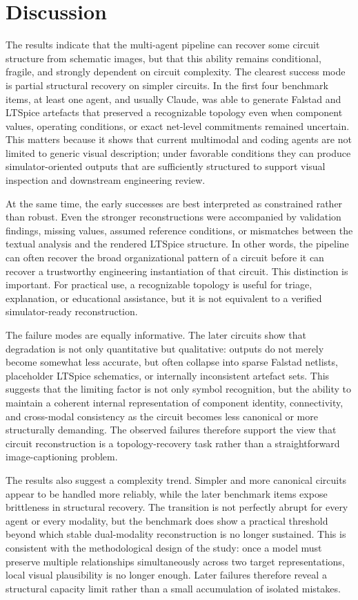 \section{Discussion}

The results indicate that the multi-agent pipeline can recover some circuit structure from schematic images, but that this ability remains conditional, fragile, and strongly dependent on circuit complexity. The clearest success mode is partial structural recovery on simpler circuits. In the first four benchmark items, at least one agent, and usually Claude, was able to generate Falstad and LTSpice artefacts that preserved a recognizable topology even when component values, operating conditions, or exact net-level commitments remained uncertain. This matters because it shows that current multimodal and coding agents are not limited to generic visual description; under favorable conditions they can produce simulator-oriented outputs that are sufficiently structured to support visual inspection and downstream engineering review.

At the same time, the early successes are best interpreted as constrained rather than robust. Even the stronger reconstructions were accompanied by validation findings, missing values, assumed reference conditions, or mismatches between the textual analysis and the rendered LTSpice structure. In other words, the pipeline can often recover the broad organizational pattern of a circuit before it can recover a trustworthy engineering instantiation of that circuit. This distinction is important. For practical use, a recognizable topology is useful for triage, explanation, or educational assistance, but it is not equivalent to a verified simulator-ready reconstruction.

The failure modes are equally informative. The later circuits show that degradation is not only quantitative but qualitative: outputs do not merely become somewhat less accurate, but often collapse into sparse Falstad netlists, placeholder LTSpice schematics, or internally inconsistent artefact sets. This suggests that the limiting factor is not only symbol recognition, but the ability to maintain a coherent internal representation of component identity, connectivity, and cross-modal consistency as the circuit becomes less canonical or more structurally demanding. The observed failures therefore support the view that circuit reconstruction is a topology-recovery task rather than a straightforward image-captioning problem.

The results also suggest a complexity trend. Simpler and more canonical circuits appear to be handled more reliably, while the later benchmark items expose brittleness in structural recovery. The transition is not perfectly abrupt for every agent or every modality, but the benchmark does show a practical threshold beyond which stable dual-modality reconstruction is no longer sustained. This is consistent with the methodological design of the study: once a model must preserve multiple relationships simultaneously across two target representations, local visual plausibility is no longer enough. Later failures therefore reveal a structural capacity limit rather than a small accumulation of isolated mistakes.

